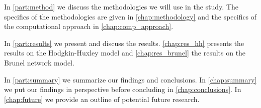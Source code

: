 In \autoref{part:method} we discuss the methodologies we will use in the study. The specifics of the methodologies are given in \cref{chap:methodology} and the specifics of the computational approach in \cref{chap:comp_approach}. 

In \autoref{part:results} we present and discuss the results. \cref{chap:res_hh} presents the results on the Hodgkin-Huxley model and \cref{chap:res_brunel} the results on the Brunel network model. 

In \autoref{part:summary} we summarize our findings and conclusions. In \cref{chap:summary} we put our findings in perspective before concluding in \cref{chap:conclusions}. In \cref{chap:future} we provide an outline of potential future research. 

